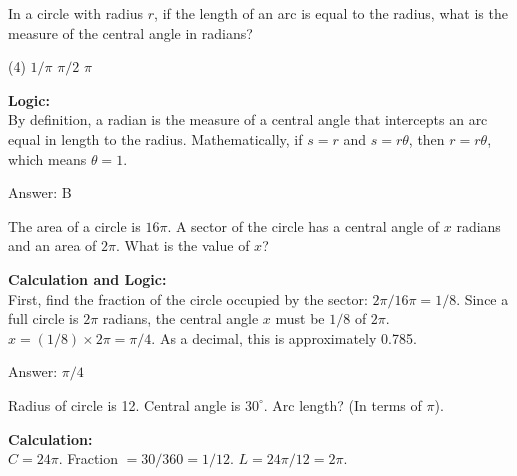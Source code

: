 \documentclass[11pt,paper=a4,answers]{exam}
\begin{document}
\begin{questions}
\question
In a circle with radius $r$, if the length of an arc is equal to the radius, what is the measure of the central angle in radians?
\begin{tasks}(4)
    \task $1/\pi$
    \task $\pi/2$
    \task $\pi$
\end{tasks}

\begin{solution}
\textbf{Logic:} \\
By definition, a radian is the measure of a central angle that intercepts an arc equal in length to the radius. Mathematically, if $s = r$ and $s = r\theta$, then $r = r\theta$, which means $\theta = 1$.

\vspace{30pt}

Answer: \colorbox{yellow!100}{B}
\end{solution}

\vspace{60pt}

\question
The area of a circle is $16\pi$. A sector of the circle has a central angle of $x$ radians and an area of $2\pi$. What is the value of $x$?

\begin{solution}
\textbf{Calculation and Logic:} \\
First, find the fraction of the circle occupied by the sector: $2\pi / 16\pi = 1 / 8$. Since a full circle is $2\pi$ radians, the central angle $x$ must be $1/8$ of $2\pi$. $x = (1/8) \times 2\pi = \pi / 4$. As a decimal, this is approximately 0.785.

\vspace{30pt}

Answer: \colorbox{yellow!100}{$\pi/4$}
\end{solution}

\vspace{60pt}

\question
Radius of circle is 12. Central angle is $30^\circ$. Arc length? (In terms of $\pi$).

\begin{solution}
\textbf{Calculation:} \\
$C = 24\pi$. Fraction $= 30/360 = 1/12$. $L = 24\pi / 12 = 2\pi$.

\vspace{30pt}


\end{solution}
\end{questions}
\end{document}
